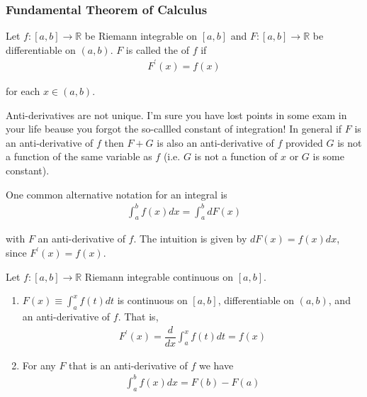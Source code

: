 \documentclass{article}
\begin{document}
\subsubsection{Fundamental Theorem of Calculus}
\label{ssub:fundamental_theorem_of_calculus}

\begin{definition}
  Let $f: [a, b] \to \mathbb{R}$ be Riemann integrable on $[a, b]$ and $F: [a, b] \to \mathbb{R}$ be differentiable on $(a, b)$. $F$ is called the  of $f$ if
  \begin{align*}
    F^{\prime}(x) = f(x)
  \end{align*}

  for each $x \in (a, b)$.
\end{definition}

\begin{remark}
  Anti-derivatives are not unique. I'm sure you have lost points in some exam in your life beause you forgot the so-callled constant of integration! In general if $F$ is an anti-derivative of $f$ then $F + G$ is also an anti-derivative of $f$ provided $G$ is not a function of the same variable as $f$ (i.e. $G$ is not a function of $x$ or $G$ is some constant).
\end{remark}

\begin{remark}
  One common alternative notation for an integral is
  \begin{align*}
    \int_{a}^{b} f(x) dx
    =
    \int_{a}^{b} dF(x)
  \end{align*}

  with $F$ an anti-derivative of $f$. The intuition is given by $dF(x) = f(x) dx$, since $F^\prime(x) = f(x)$.
\end{remark}

\begin{theorem}
  Let $f: [a, b] \to \mathbb{R}$ Riemann integrable continuous on $[a, b]$.
  \begin{enumerate}
    \item $F(x) \equiv \displaystyle\int_a^x f(t) dt$ is continuous on $[a, b]$, differentiable on $(a, b)$, and an anti-derivative of $f$. That is,
      \begin{align*}
        F^{\prime}(x) = \dfrac{d}{dx} \int_{a}^{x} f(t) dt = f(x)
      \end{align*}

    \item For any $F$ that is an anti-derivative of $f$ we have
      \begin{align*}
        \int_{a}^{b} f(x) dx = F(b) - F(a)
      \end{align*}
  \end{enumerate}
\end{theorem}
\end{document}
